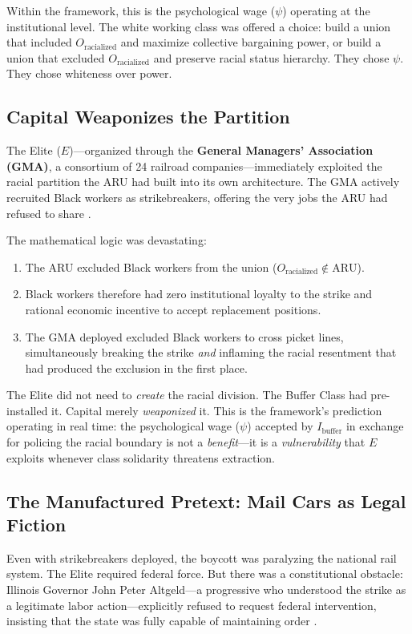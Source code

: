\documentclass[12pt,openany]{book}
\begin{document}
Within the framework, this is the psychological wage ($\psi$) operating at the institutional level. The white working class was offered a choice: build a union that included $O_{\text{racialized}}$ and maximize collective bargaining power, or build a union that excluded $O_{\text{racialized}}$ and preserve racial status hierarchy. They chose $\psi$. They chose whiteness over power.

\subsection{Capital Weaponizes the Partition}

The Elite ($E$)---organized through the \textbf{General Managers' Association (GMA)}, a consortium of 24 railroad companies---immediately exploited the racial partition the ARU had built into its own architecture. The GMA actively recruited Black workers as strikebreakers, offering the very jobs the ARU had refused to share \cite{arnesen_waterfront, lindsey_pullman}.

The mathematical logic was devastating:
\begin{enumerate}
    \item The ARU excluded Black workers from the union ($O_{\text{racialized}} \notin \text{ARU}$).
    \item Black workers therefore had zero institutional loyalty to the strike and rational economic incentive to accept replacement positions.
    \item The GMA deployed excluded Black workers to cross picket lines, simultaneously breaking the strike \textit{and} inflaming the racial resentment that had produced the exclusion in the first place.
\end{enumerate}

The Elite did not need to \textit{create} the racial division. The Buffer Class had pre-installed it. Capital merely \textit{weaponized} it. This is the framework's prediction operating in real time: the psychological wage ($\psi$) accepted by $I_{\text{buffer}}$ in exchange for policing the racial boundary is not a \textit{benefit}---it is a \textit{vulnerability} that $E$ exploits whenever class solidarity threatens extraction.

\subsection{The Manufactured Pretext: Mail Cars as Legal Fiction}

Even with strikebreakers deployed, the boycott was paralyzing the national rail system. The Elite required federal force. But there was a constitutional obstacle: Illinois Governor John Peter Altgeld---a progressive who understood the strike as a legitimate labor action---explicitly refused to request federal intervention, insisting that the state was fully capable of maintaining order \cite{lindsey_pullman}.
\end{document}
